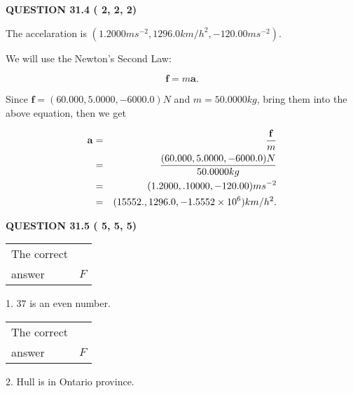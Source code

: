\documentclass[12pt]{article}
\begin{document}
\vspace{0.2in}
  
{\textbf{\Large{QUESTION
31.4 
 (          2,          2,          2)
}}}
  
  
 
 
\noindent{}
 
 
The accelaration is
$(
1.2000ms^{-2},
1296.0km/h^2,
-120.00ms^{-2}
).
$
 
 
 
 
 
 
\noindent{}

We will use the Newton's Second Law:
 
\[
\mathbf{f}=m\mathbf{a}.
\]
 
Since $\mathbf{f}=( %
60.000,  %
5.0000,  %
-6000.0 )N$
and $m= %
50.0000kg$, bring them into the above equation, then we get
 
\begin{eqnarray*}
\mathbf{a}&=&\frac{\mathbf{f}}m  \\
&=&\frac{(
60.000 ,
5.0000 ,
-6000.0 )N
}{ %
50.0000 kg}  \\
&=&(
1.2000 ,
.10000,
-120.00
)ms^{-2} \\
&=&(
15552. ,
1296.0 ,
-1.5552 \times 10^{6}
)km/h^2.
\end{eqnarray*}
 
 
 
  
\vspace{0.2in}
  
{\textbf{\Large{QUESTION
31.5 
 (          5,          5,          5)
}}}
  
  
 
 
\noindent{}

 
\noindent\begin{tabular}{|l|l|}\hline The correct & \\
          answer &  %
$F$ \\ \hline \end{tabular}
1. $ %
37$ is an  %
even number.
 
\noindent\begin{tabular}{|l|l|}\hline The correct & \\
          answer &  %
$F$ \\ \hline \end{tabular}
2.  %
Hull is in  %
Ontario province.
 
\end{document}
